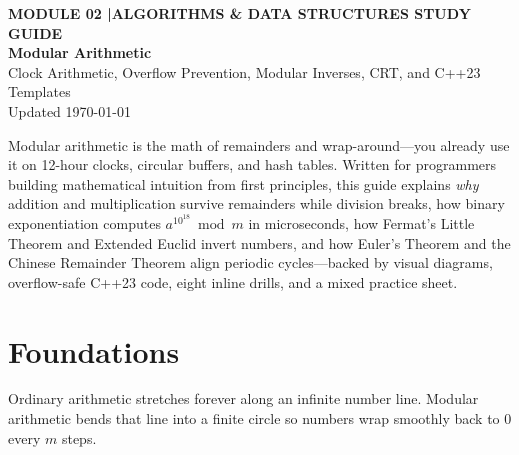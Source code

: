 \documentclass[11pt,a4paper]{article}
\newcommand{\sectionbreak}{}
\theoremstyle{definition}
\begin{document}
\thispagestyle{plain}
\begin{tcolorbox}[
    enhanced,
    colback=primaryblue!6, colframe=primaryblue!20,
    borderline west={5pt}{0pt}{primaryblue},
    arc=4pt, boxrule=0.6pt,
    left=14pt, right=14pt, top=10pt, bottom=10pt,
    before skip=0pt, after skip=8pt
]
    {\footnotesize\bfseries\color{accentteal}MODULE 02 \quad|\quad ALGORITHMS \& DATA STRUCTURES STUDY GUIDE}\\[4pt]
    {\Huge\bfseries\color{primaryblue}Modular Arithmetic}\\[4pt]
    {\large\color{codegray}Clock Arithmetic, Overflow Prevention, Modular Inverses, CRT, and C++23 Templates}\\[5pt]
    {\footnotesize\color{codegray}Updated \today}
\end{tcolorbox}

\begin{overviewbox}
Modular arithmetic is the math of remainders and wrap-around---you already use it on 12-hour clocks, circular buffers, and hash tables. Written for programmers building mathematical intuition from first principles, this guide explains \emph{why} addition and multiplication survive remainders while division breaks, how binary exponentiation computes $a^{10^{18}} \bmod m$ in microseconds, how Fermat's Little Theorem and Extended Euclid invert numbers, and how Euler's Theorem and the Chinese Remainder Theorem align periodic cycles---backed by visual diagrams, overflow-safe C++23 code, eight inline drills, and a mixed practice sheet.
\end{overviewbox}

\vspace{1pt}
{\setlength{\parskip}{0pt}\footnotesize\tableofcontents}

\renewcommand{\sectionbreak}{\clearpage}

\section{Foundations}

Ordinary arithmetic stretches forever along an infinite number line. Modular arithmetic bends that line into a finite circle so numbers wrap smoothly back to $0$ every $m$ steps.
\end{document}
